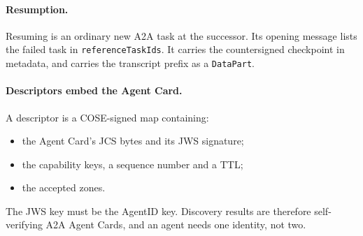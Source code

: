 \paragraph{Resumption.}
Resuming is an ordinary new A2A task at the successor. Its opening
message lists the failed task in \texttt{referenceTaskIds}. It carries the
countersigned checkpoint in metadata, and carries the transcript prefix as
a \texttt{DataPart}.

\paragraph{Descriptors embed the Agent Card.}
A \sys{} descriptor is a COSE-signed map containing:
\begin{itemize}
\item the Agent Card's JCS bytes and its JWS signature;
\item the capability keys, a sequence number and a TTL;
\item the accepted zones.
\end{itemize}
The JWS key must be the AgentID key. Discovery results are therefore
self-verifying A2A Agent Cards, and an agent needs one identity, not two.
